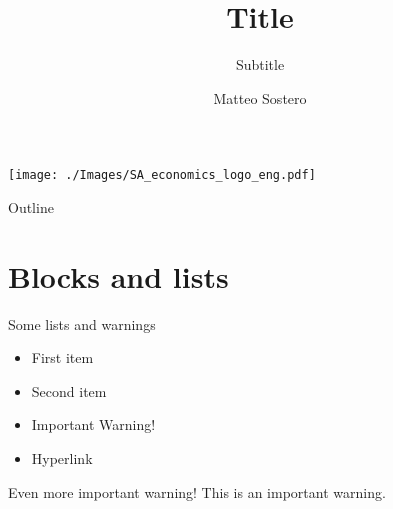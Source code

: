 \documentclass{beamer}                %
\author{Matteo Sostero}
\institute{Sant'Anna School of Advanced Studies, Pisa}
\title{Title}
\subtitle{Subtitle}
\begin{document}
\begin{frame}
\texttt{[image: ./Images/SA\_economics\_logo\_eng.pdf]}
\maketitle
\end{frame}



\begin{frame}{Outline}
\tableofcontents
\end{frame}



\section{Blocks and lists}
\begin{frame}{Some lists and warnings}
\begin{itemize}[<+->]
  \item First item
  \item Second item
  \item \alert{Important Warning!}
  \item Hyperlink  
\end{itemize}
\pause[\thebeamerpauses]
\begin{alertblock}{Even more important warning!}
This is an important warning.
\end{alertblock}
\end{frame}
\end{document}
